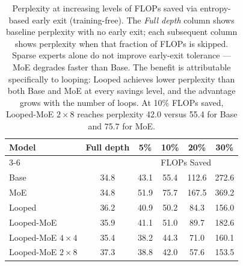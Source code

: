 \documentclass{article}
\begin{document}
\begin{table}[t]
    \centering
    \caption{Perplexity at increasing levels of FLOPs saved via entropy-based early exit (training-free). The \emph{Full depth} column shows baseline perplexity with no early exit; each subsequent column shows perplexity when that fraction of FLOPs is skipped. Sparse experts alone do not improve early-exit tolerance --- MoE degrades faster than Base. The benefit is attributable specifically to looping: Looped achieves lower perplexity than both Base and MoE at every savings level, and the advantage grows with the number of loops. At 10\% FLOPs saved, Looped-MoE $2\times8$ reaches perplexity 42.0 versus 55.4 for Base and 75.7 for MoE.}
    \begin{tabular}{lccccc}
    \toprule
    Model & Full depth & 5\% & 10\% & 20\% & 30\% \\
    \cmidrule(lr){3-6}
    & & \multicolumn{4}{c}{FLOPs Saved} \\
    \midrule
    Base & 34.8 & 43.1 & 55.4 & 112.6 & 272.6 \\
    MoE & 34.8 & 51.9 & 75.7 & 167.5 & 369.2 \\
    Looped & 36.2 & 40.9 & 50.2 & 84.3 & 156.0 \\
    Looped-MoE & 35.9 & 41.1 & 51.0 & 89.7 & 182.6 \\
    Looped-MoE $4\times4$ & 35.4 & 38.2 & 44.3 & 71.0 & 160.1 \\
    Looped-MoE $2\times8$ & 37.3 & 38.8 & 42.0 & 57.6 & 153.5 \\
    \bottomrule
    \end{tabular}
    
    \label{tab:ee_perplexity}
\end{table}

% 
\end{document}

